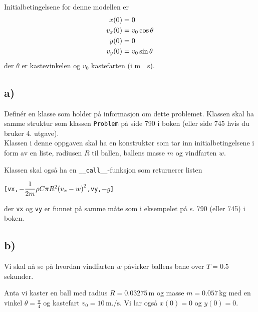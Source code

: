 \documentclass[10pt,a4paper]{article}
\begin{document}
Initialbetingelsene for denne modellen er
\begin{align*} 
	x(0) &= 0 \\
	v_x(0) &= v_0\cos\theta
	\hfill \\
	y(0) &= 0 \\
	v_y(0) &= v_0\sin\theta
\end{align*}
der $\theta$ er kastevinkelen og $v_0$ kastefarten (i \si{\meter.\per\second}). 

\subsection*{a)}
Definér en klasse som holder på informasjon om dette problemet. Klassen skal ha samme struktur som klassen \texttt{Problem} på side 790 i boken (eller side 745 hvis du bruker 4. utgave). \\
Klassen i denne oppgaven skal ha en konstruktør som tar inn initialbetingelsene i form av en liste, radiusen $R$ til ballen, ballens masse $m$ og vindfarten $w$. 

Klassen skal også ha en \texttt{\_\_call\_\_}-funksjon som returnerer listen 
\begin{center}
	\texttt{[vx,$ -\dfrac{1}{2m}\rho C \pi R^2 \qty(v_x - w)^2$,vy,$-g$]}  
\end{center}
der \texttt{vx} og \texttt{vy} er funnet på samme måte som i eksempelet på s. 790 (eller 745) i boken. 


\subsection*{b)} 
Vi skal nå se på hvordan vindfarten $w$ påvirker ballens bane over $T = 0.5$ sekunder. 

Anta vi kaster en ball med radius $R = 0.03275\,\si{\meter}$ og masse $m = 0.057\,\si{\kg}$ med en vinkel $\theta = \frac{\pi}{4}$ og kastefart $ v_0 = 10 \,\si{\meter.\per\second}$. Vi lar også $x(0) = 0$ og $y(0) = 0$.
\end{document}
